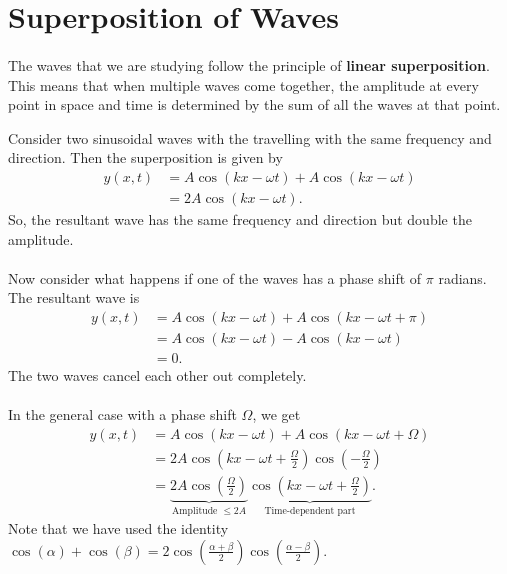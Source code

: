 \documentclass[../newtonian_mechanics.tex]{subfiles}
\begin{document}
    \section{Superposition of Waves}
        \paragraph{}
        The waves that we are studying follow the principle of \textbf{linear superposition}.
        This means that when multiple waves come together, the amplitude at every point in space and time is determined by the sum of all the waves at that point.
        \begin{example}
            Consider two sinusoidal waves with the travelling with the same frequency and direction.
            Then the superposition is given by
            \begin{align}
                y(x, t) &= A\cos(kx-\omega t) + A\cos(kx-\omega t)\\
                &= 2A\cos(kx-\omega t).
            \end{align}
            So, the resultant wave has the same frequency and direction but double the amplitude.

            \paragraph{}
            Now consider what happens if one of the waves has a phase shift of $\pi$ radians.
            The resultant wave is
            \begin{align}
                y(x, t) &= A\cos(kx-\omega t) + A\cos(kx-\omega t+\pi)\\
                &= A\cos(kx-\omega t) - A\cos(kx-\omega t)\\
                &= 0.
            \end{align}
            The two waves cancel each other out completely.

            \paragraph{}
            In the general case with a phase shift $\Omega$, we get
            \begin{align}
                y(x, t) &=A\cos(kx-\omega t) + A\cos(kx-\omega t+\Omega)\\
                &= 2A\cos\left(kx-\omega t+\frac{\Omega}{2}\right)\cos\left(-\frac{\Omega}{2}\right)\\
                &= \underbrace{2A\cos\left(\frac{\Omega}{2}\right)}_{\text{Amplitude }\leq 2A}\underbrace{\cos\left(kx-\omega t+\frac{\Omega}{2}\right)}_{\text{Time-dependent part}}.
            \end{align}
            Note that we have used the identity $\cos(\alpha)+\cos(\beta)=2\cos\left(\frac{\alpha+\beta}{2}\right)\cos\left(\frac{\alpha-\beta}{2}\right)$.
        \end{example}
\end{document}
